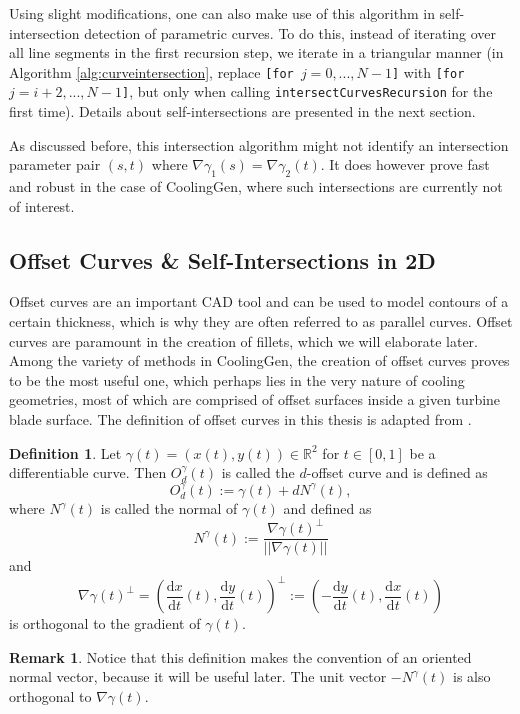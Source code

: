 \documentclass[a4paper, 11pt]{report}
\theoremstyle{definition}
\newtheorem{definition}{Definition}[section]
\newtheorem*{remark}{Remark}
\newcommand{\derivative}[2]{\frac{\textrm{d}{#1}}{\textrm{d}{#2}}}
\begin{document}
	Using slight modifications, one can also make use of this algorithm in self-intersection detection of parametric curves. To do this, instead of iterating over all line segments in the first recursion step, we iterate in a triangular manner (in Algorithm \ref{alg:curveintersection}, replace \texttt{[for $j = 0, ..., N-1$]} with \texttt{[for $j = i+2, ..., N-1$]}, but only when calling \texttt{intersectCurvesRecursion} for the first time). Details about self-intersections are presented in the next section.

	As discussed before, this intersection algorithm might not identify an intersection parameter pair $(s,t)$ where $\nabla \gamma_1(s) = \nabla \gamma_2(t)$. It does however prove fast and robust in the case of CoolingGen, where such intersections are currently not of interest.

\subsection{Offset Curves \& Self-Intersections in 2D}\label{sec:offsetcurves}
	Offset curves are an important CAD tool and can be used to model contours of a certain thickness, which is why they are often referred to as parallel curves. Offset curves are paramount in the creation of fillets, which we will elaborate later. Among the variety of methods in CoolingGen, the creation of offset curves proves to be the most useful one, which perhaps lies in the very nature of cooling geometries, most of which are comprised of offset surfaces inside a given turbine blade surface. The definition of offset curves in this thesis is adapted from \cite{Elber1997}.

	\begin{definition}\label{def:offseteasy}
		Let $\gamma(t) = (x(t), y(t)) \in \mathbb{R}^2$ for $t\in[0,1]$ be a differentiable curve. Then $O^\gamma_d(t)$ is called the $d$-offset curve and is defined as
			$$ O^\gamma_d(t) := \gamma(t) + dN^\gamma(t),$$
		where $N^\gamma(t)$ is called the normal of $\gamma(t)$ and defined as
			$$N^\gamma(t) := \frac{\nabla\gamma(t)^\perp}{||\nabla\gamma(t)||}$$
		and
			$$\nabla\gamma(t)^\perp = \left(\derivative{x}{t}(t), \derivative{y}{t}(t)\right)^\perp := \left(-\derivative{y}{t}(t), \derivative{x}{t}(t)\right)$$
		is orthogonal to the gradient of $\gamma(t)$.
	\end{definition}

	\begin{remark}
		Notice that this definition makes the convention of an oriented normal vector, because it will be useful later. The unit vector $-N^\gamma(t)$ is also orthogonal to $\nabla \gamma(t)$.
	\end{remark}
\end{document}
